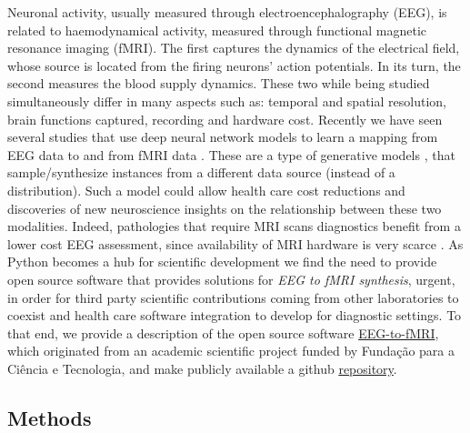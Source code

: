 Neuronal activity, usually measured through electroencephalography (EEG), is related to haemodynamical activity, measured through functional magnetic resonance imaging (fMRI). The first captures the dynamics of the electrical field, whose source is located from the firing neurons' action potentials. In its turn, the second measures the blood supply dynamics. These two while being studied simultaneously \citep{shibasaki2008human,yu2016building,he2018spatialtemporaldo,rojas2018study,brechet2019capturing,daly2019electroencephalography,cury2020sparse,abreu2021eeg} differ in many aspects such as: temporal and spatial resolution, brain functions captured, recording and hardware cost. Recently we have seen several studies that use deep neural network models \citep{goodfellow2016deep} to learn a mapping from EEG data to and from fMRI data \citep{liu2019convolutional, calhas2022eeg}. These are a type of generative models \citep{murphy2012machine}, that sample/synthesize instances from a different data source (instead of a distribution). Such a model could allow health care cost reductions and discoveries of new neuroscience insights on the relationship between these two modalities. Indeed, pathologies that require MRI scans diagnostics benefit from a lower cost EEG assessment, since availability of MRI hardware is very scarce \citep{ogbole2018survey}. As Python \citep{van1995python} becomes a hub for scientific development \citep{harris2020array,virtanen2020scipy,abadi2016tensorflow} we find the need to provide open source software that provides solutions for \textit{EEG to fMRI synthesis}, urgent, in order for third party scientific contributions coming from other laboratories to coexist and health care software integration to develop for diagnostic settings. To that end, we provide a description of the open source software \href{https://pypi.org/project/eeg-to-fmri/}{EEG-to-fMRI}, which originated from an academic scientific project funded by Funda\c{c}\~{a}o para a Ci\^{e}ncia e Tecnologia, and make publicly available a github \href{https://github.com/eeg-to-fmri/eeg-to-fmri}{repository}.

\subsection{Methods}\label{section:methods}

